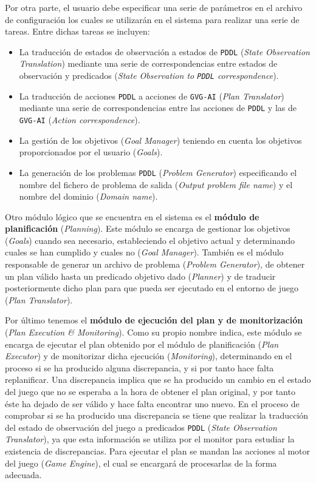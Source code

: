 Por otra parte, el usuario debe especificar una serie de parámetros en el archivo de
configuración los cuales se utilizarán en el sistema para realizar una serie de tareas.
Entre dichas tareas se incluyen:

\begin{itemize}[label=\textbullet]
    \item La traducción de estados de observación a estados de \texttt{PDDL}
    (\textit{State Observation Translation}) mediante una serie de correspondencias entre
    estados de observación y predicados (\textit{State Observation to \texttt{PDDL} correspondence}).
    \item La traducción de acciones \texttt{PDDL} a acciones de \texttt{GVG-AI}
    (\textit{Plan Translator}) mediante una serie de correspondencias entre las acciones de
    \texttt{PDDL} y las de \texttt{GVG-AI} (\textit{Action correspondence}).
    \item La gestión de los objetivos (\textit{Goal Manager}) teniendo en cuenta los
    objetivos proporcionados por el usuario (\textit{Goals}).
    \item La generación de los problemas \texttt{PDDL} (\textit{Problem Generator})
    especificando el nombre del fichero de problema de salida (\textit{Output problem file name})
    y el nombre del dominio (\textit{Domain name}).
\end{itemize}


Otro módulo lógico que se encuentra en el sistema es el \textbf{módulo de planificación}
(\textit{Planning}). Este módulo se encarga de gestionar los objetivos (\textit{Goals}) cuando
sea necesario, estableciendo el objetivo actual y determinando cuales se han cumplido y cuales no
(\textit{Goal Manager}). También es el módulo responsable de generar un archivo de problema
(\textit{Problem Generator}), de obtener un plan válido hasta un predicado objetivo dado
(\textit{Planner}) y de traducir posteriormente dicho plan para que pueda ser ejecutado
en el entorno de juego (\textit{Plan Translator}).

Por último tenemos el \textbf{módulo de ejecución del plan y de monitorización}
(\textit{Plan Execution \& Monitoring}). Como su propio nombre indica, este módulo
se encarga de ejecutar el plan obtenido por el módulo de planificación (\textit{Plan Executor})
y de monitorizar dicha ejecución (\textit{Monitoring}), determinando en el proceso si se ha
producido alguna discrepancia, y si por tanto hace falta replanificar. Una discrepancia implica
que se ha producido un cambio en el estado del juego que no se esperaba a la hora de obtener
el plan original, y por tanto éste ha dejado de ser válido y hace falta encontrar uno nuevo.
En el proceso de comprobar si se ha producido una discrepancia se tiene que realizar la traducción del
estado de observación del juego a predicados \texttt{PDDL} (\textit{State Observation Translator}),
ya que esta información se utiliza por el monitor para estudiar la existencia de discrepancias.
Para ejecutar el plan se mandan las acciones al motor del juego (\textit{Game Engine}), el cual
se encargará de procesarlas de la forma adecuada.

